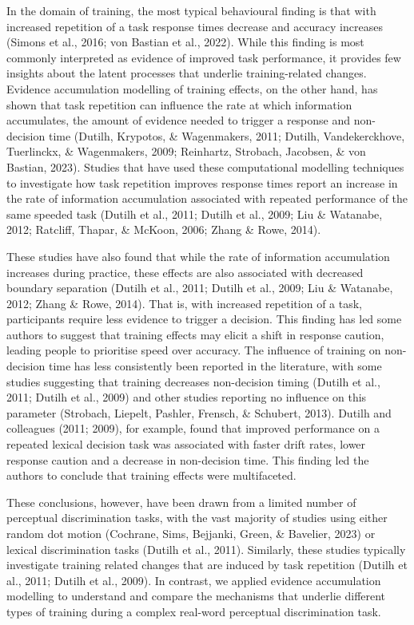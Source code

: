 \documentclass[
  man, donotrepeattitle,floatsintext]{apa6}
\begin{document}
In the domain of training, the most typical behavioural finding is that with increased repetition of a task response times decrease and accuracy increases (Simons et al., 2016; von Bastian et al., 2022). While this finding is most commonly interpreted as evidence of improved task performance, it provides few insights about the latent processes that underlie training-related changes. Evidence accumulation modelling of training effects, on the other hand, has shown that task repetition can influence the rate at which information accumulates, the amount of evidence needed to trigger a response and non-decision time (Dutilh, Krypotos, \& Wagenmakers, 2011; Dutilh, Vandekerckhove, Tuerlinckx, \& Wagenmakers, 2009; Reinhartz, Strobach, Jacobsen, \& von Bastian, 2023). Studies that have used these computational modelling techniques to investigate how task repetition improves response times report an increase in the rate of information accumulation associated with repeated performance of the same speeded task (Dutilh et al., 2011; Dutilh et al., 2009; Liu \& Watanabe, 2012; Ratcliff, Thapar, \& McKoon, 2006; Zhang \& Rowe, 2014).

These studies have also found that while the rate of information accumulation increases during practice, these effects are also associated with decreased boundary separation (Dutilh et al., 2011; Dutilh et al., 2009; Liu \& Watanabe, 2012; Zhang \& Rowe, 2014). That is, with increased repetition of a task, participants require less evidence to trigger a decision. This finding has led some authors to suggest that training effects may elicit a shift in response caution, leading people to prioritise speed over accuracy. The influence of training on non-decision time has less consistently been reported in the literature, with some studies suggesting that training decreases non-decision timing (Dutilh et al., 2011; Dutilh et al., 2009) and other studies reporting no influence on this parameter (Strobach, Liepelt, Pashler, Frensch, \& Schubert, 2013). Dutilh and colleagues (2011; 2009), for example, found that improved performance on a repeated lexical decision task was associated with faster drift rates, lower response caution and a decrease in non-decision time. This finding led the authors to conclude that training effects were multifaceted.

These conclusions, however, have been drawn from a limited number of perceptual discrimination tasks, with the vast majority of studies using either random dot motion (Cochrane, Sims, Bejjanki, Green, \& Bavelier, 2023) or lexical discrimination tasks (Dutilh et al., 2011). Similarly, these studies typically investigate training related changes that are induced by task repetition (Dutilh et al., 2011; Dutilh et al., 2009). In contrast, we applied evidence accumulation modelling to understand and compare the mechanisms that underlie different types of training during a complex real-word perceptual discrimination task.
\end{document}
